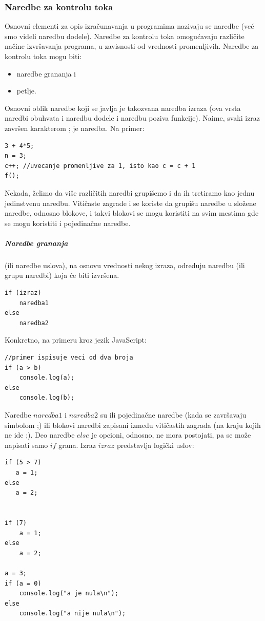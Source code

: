 \documentclass[a4paper]{article}
\begin{document}
\subsubsection{Naredbe za kontrolu toka}
Osnovni elementi za opis izračunavanja u programima nazivaju se naredbe (već smo videli naredbu dodele).
Naredbe za kontrolu toka omogućavaju različite načine izvršavanja programa, u zavisnosti od vrednosti promenljivih. Naredbe za kontrolu toka mogu biti:
\begin{itemize}
\item naredbe grananja i 
\item petlje.
\end{itemize}
Osnovni oblik naredbe koji se javlja je takozvana naredba izraza (ova vrsta naredbi obuhvata i naredbu dodele i naredbu poziva funkcije).
Naime, svaki izraz završen karakterom ; je naredba. Na primer:
\begin{verbatim}
3 + 4*5;
n = 3;
c++; //uvecanje promenljive za 1, isto kao c = c + 1
f();	
\end{verbatim}
Nekada, želimo da više različitih naredbi grupišemo i da ih tretiramo kao jednu jedinstvenu naredbu. Vitičaste zagrade { i } se koriste da grupišu naredbe u složene naredbe, odnosno blokove, i takvi blokovi se mogu koristiti na svim mestima gde se mogu koristiti i pojedinačne naredbe. 

\subparagraph{Naredbe grananja} (ili naredbe uslova), na osnovu vrednosti nekog izraza, odreduju naredbu (ili grupu naredbi) koja će biti izvršena.
\begin{verbatim}
if (izraz)
    naredba1
else
    naredba2
\end{verbatim}
Konkretno, na primeru kroz jezik JavaScript:
\begin{verbatim}
//primer ispisuje veci od dva broja
if (a > b)
    console.log(a);
else
    console.log(b);
\end{verbatim}
Naredbe $naredba1$ i $naredba2$ su ili pojedinačne naredbe (kada se završavaju simbolom ;) ili blokovi naredbi zapisani između vitičastih zagrada (na kraju kojih ne ide ;).
Deo naredbe $else$ je opcioni, odnosno, ne mora postojati, pa se može napisati samo $if$ grana.
Izraz $izraz$ predstavlja logički uslov:
\begin{verbatim}
if (5 > 7)
   a = 1;
else
   a = 2;


if (7)
    a = 1;
else 
    a = 2;
    
a = 3;
if (a = 0)
    console.log("a je nula\n");
else
    console.log("a nije nula\n");
\end{verbatim}
\end{document}
